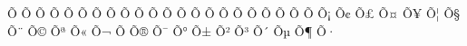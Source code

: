^^d5^^81{\Armdza}%
^^d5^^82{\Armghat}%
^^d5^^83{\Armtche}%
^^d5^^84{\Armmen}%
^^d5^^85{\Armhi}%
^^d5^^86{\Armnu}%
^^d5^^87{\Armsha}%
^^d5^^88{\Armvo}%
^^d5^^89{\Armcha}%
^^d5^^8a{\Armpe}%
^^d5^^8b{\Armje}%
^^d5^^8c{\Armra}%
^^d5^^8d{\Armse}%
^^d5^^8e{\Armvev}%
^^d5^^8f{\Armtyun}%
^^d5^^90{\Armre}%
^^d5^^91{\Armtso}%
^^d5^^92{\Armvyun}%
^^d5^^93{\Armpyur}%
^^d5^^94{\Armke}%
^^d5^^95{\Armo}%
^^d5^^96{\Armfe}%
%
%
^^d5^^a1{\armayb}%
^^d5^^a2{\armben}%
^^d5^^a3{\armgim}%
^^d5^^a4{\armda}%
^^d5^^a5{\armyech}%
^^d5^^a6{\armza}%
^^d5^^a7{\arme}%
^^d5^^a8{\armat}%
^^d5^^a9{\armto}%
^^d5^^aa{\armzhe}%
^^d5^^ab{\armini}%
^^d5^^ac{\armlyun}%
^^d5^^ad{\armkhe}%
^^d5^^ae{\armtsa}%
^^d5^^af{\armken}%
^^d5^^b0{\armho}%
^^d5^^b1{\armdza}%
^^d5^^b2{\armghat}%
^^d5^^b3{\armtche}%
^^d5^^b4{\armmen}%
^^d5^^b5{\armhi}%
^^d5^^b6{\armnu}%
^^d5^^b7{\armsha}%
